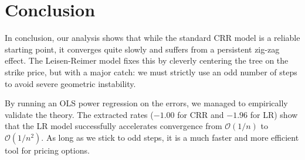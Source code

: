 \documentclass{report}
\begin{document}
\section{Conclusion}
In conclusion, our analysis shows that while the standard CRR model is a reliable starting point, it converges quite slowly and suffers from a persistent zig-zag effect. The Leisen-Reimer model fixes this by cleverly centering the tree on the strike price, but with a major catch: we must strictly use an odd number of steps to avoid severe geometric instability.

By running an OLS power regression on the errors, we managed to empirically validate the theory. The extracted rates ($-1.00$ for CRR and $-1.96$ for LR) show that the LR model successfully accelerates convergence from $\mathcal{O}(1/n)$ to $\mathcal{O}(1/n^2)$. As long as we stick to odd steps, it is a much faster and more efficient tool for pricing options.
\end{document}
